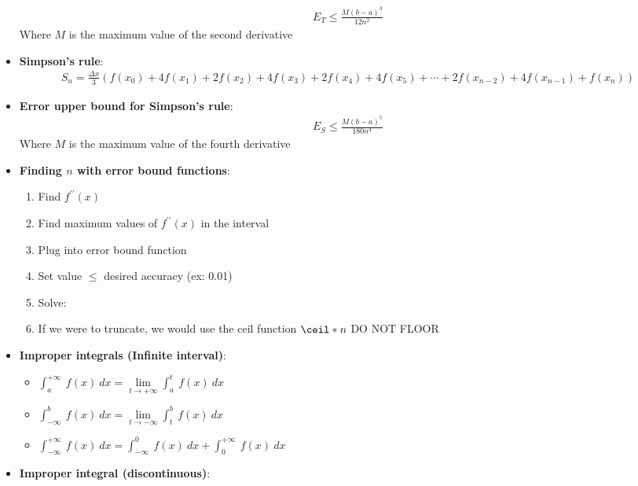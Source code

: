 \documentclass{report}
\begin{document}
\begin{itemize}
\begin{align*}
                E_{T} \leq \frac{M(b-a)^3}{12n^2}
            \end{align*}
            Where $M$ is the maximum value of the second derivative
        \item \textbf{Simpson’s rule}:
            \begin{align*}
                S_n = \frac{\Delta x}{3} \left( f(x_0) + 4f(x_1) + 2f(x_2) + 4f(x_3) + 2f(x_4) + 4f(x_5) + \cdots + 2f(x_{n-2}) + 4f(x_{n-1}) + f(x_n) \right)
            \end{align*}
        \item \textbf{Error upper bound for Simpson’s rule}:
            \begin{align*}
                E_{S} \leq \frac{M(b-a)^5}{180n^4}
            \end{align*}
            Where $M$ is the maximum value of the fourth derivative
        \item \textbf{Finding $n$ with error bound functions}:
            \begin{enumerate}
                \item Find $f^{\prime\prime}(x)$
                \item Find maximum values of $f^{\prime\prime}(x)$ in the interval
                \item Plug into error bound function 
                \item Set value $\leq$ desired accuracy (ex: 0.01)
                \item Solve: 
                \item If we were to truncate, we would use the ceil function $\ceil*{n}$ DO NOT FLOOR
            \end{enumerate}
        \item \textbf{Improper integrals (Infinite interval)}:
            \begin{itemize}
                \item $\int_{a}^{+\infty}\ f(x)\ dx  = \lim\limits_{t \to +\infty}{\int_{a}^{t}\ f(x)\ dx}$  
                \item $\int_{-\infty}^{b}\ f(x)\ dx = \lim\limits_{t \to -\infty}{\int_{t}^{b}\ f(x)\ dx}$ 
                \item $\int_{-\infty}^{+\infty}\ f(x)\ dx = \int_{-\infty}^{0}\ f(x)\ dx + \int_{0}^{+\infty}\ f(x)\ dx$
            \end{itemize}
        \item \textbf{Improper integral (discontinuous)}:
            \begin{itemize}

\end{itemize}
\end{itemize}
\end{document}
